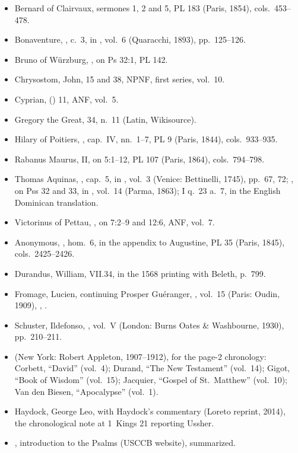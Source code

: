 {\begin{itemize}[leftmargin=1.2em,itemsep=.15em]
English, , on Ps 33.
\item Bernard of Clairvaux,  sermones 1, 2
and 5, PL 183 (Paris, 1854), cols.~453--478.
\item Bonaventure, , c.~3, in
, vol.~6 (Quaracchi, 1893), pp.~125--126.
\item Bruno of Würzburg, , on Ps 32:1, PL 142.
\item Chrysostom, John,  15 and 38, NPNF, first
series, vol.~10.
\item Cyprian,  () 11,
ANF, vol.~5.
\item Gregory the Great,  34, n.~11 (Latin,
Wikisource).
\item Hilary of Poitiers, , cap.~IV,
nn.~1--7, PL 9 (Paris, 1844), cols.~933--935.
\item Rabanus Maurus,  II, on 5:1--12, PL 107
(Paris, 1864), cols.~794--798.
\item Thomas Aquinas, , cap.~5, in
, vol.~3 (Venice: Bettinelli, 1745), pp.~67, 72;
, on Pss 32 and 33, in ,
vol.~14 (Parma, 1863);  I q.~23 a.~7, in the English
Dominican translation.
\item Victorinus of Pettau, , on 7:2--9 and
12:6, ANF, vol.~7.
\item Anonymous, , hom.~6, in the appendix to
Augustine, PL 35 (Paris, 1845), cols.~2425--2426.
\item Durandus, William,  VII.34, in the
1568 printing with Beleth, p.~799.
\item Fromage, Lucien, continuing Prosper Guéranger, , vol.~15 (Paris: Oudin, 1909), , .
\item Schuster, Ildefonso, ,
vol.~V (London: Burns Oates \& Washbourne, 1930), pp.~210--211.
\item {} (New York: Robert Appleton, 1907--1912),
for the page-2 chronology: Corbett, ``David'' (vol.~4); Durand, ``The New
Testament'' (vol.~14); Gigot, ``Book of Wisdom'' (vol.~15); Jacquier,
``Gospel of St.~Matthew'' (vol.~10); Van den Biesen, ``Apocalypse'' (vol.~1).
\item Haydock, George Leo,  with Haydock's commentary
(Loreto reprint, 2014), the chronological note at 1~Kings 21 reporting
Ussher.
\item {}, introduction to the Psalms
(USCCB website), summarized.
\end{itemize}
\par}
